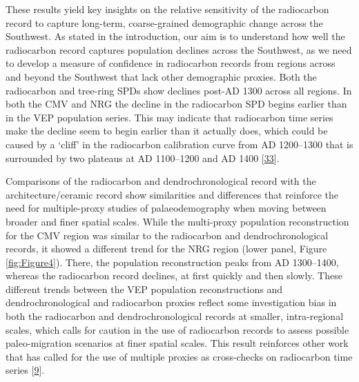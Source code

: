 \documentclass[
]{sa}
\begin{document}
These results yield key insights on the relative sensitivity of the radiocarbon record to capture long-term, coarse-grained demographic change across the Southwest. As stated in the introduction, our aim is to understand how well the radiocarbon record captures population declines across the Southwest, as we need to develop a measure of confidence in radiocarbon records from regions across and beyond the Southwest that lack other demographic proxies. Both the radiocarbon and tree-ring SPDs show declines post-AD 1300 across all regions. In both the CMV and NRG the decline in the radiocarbon SPD begins earlier than in the VEP population series. This may indicate that radiocarbon time series make the decline seem to begin earlier than it actually does, which could be caused by a `cliff' in the radiocarbon calibration curve from AD 1200--1300 that is surrounded by two plateaus at AD 1100--1200 and AD 1400 {[}\protect\hyperlink{ref-Reimer2013}{33}{]}.

Comparisons of the radiocarbon and dendrochronological record with the architecture/ceramic record show similarities and differences that reinforce the need for multiple-proxy studies of palaeodemography when moving between broader and finer spatial scales. While the multi-proxy population reconstruction for the CMV region was similar to the radiocarbon and dendrochronological records, it showed a different trend for the NRG region (lower panel, Figure \ref{fig:Figure4}). There, the population reconstruction peaks from AD 1300--1400, whereas the radiocarbon record declines, at first quickly and then slowly. These different trends between the VEP population reconstructions and dendrochronological and radiocarbon proxies reflect some investigation bias in both the radiocarbon and dendrochronological records at smaller, intra-regional scales, which calls for caution in the use of radiocarbon records to assess possible paleo-migration scenarios at finer spatial scales. This result reinforces other work that has called for the use of multiple proxies as cross-checks on radiocarbon time series {[}\protect\hyperlink{ref-Williams2012}{9}{]}.
\end{document}
